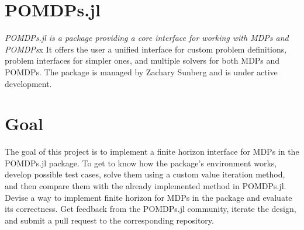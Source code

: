 \section{POMDPs.jl}
\textit{POMDPs.jl is a package providing a core interface for working with MDPs and POMDPs}\cite{JMLR:v18:16-300}x It offers the user a unified interface for custom problem definitions, problem interfaces for simpler ones, and multiple solvers for both MDPs and POMDPs. The package is managed by Zachary Sunberg and is under active development.


\section{Goal}
The goal of this project is to implement a finite horizon interface for MDPs in the POMDPs.jl package. To get to know how the package's environment works, develop possible test cases, solve them using a custom value iteration method, and then compare them with the already implemented method in POMDPs.jl. Devise a way to implement finite horizon for MDPs in the package and evaluate its correctness. Get feedback from the POMDPs.jl community, iterate the design, and submit a pull request to the corresponding repository.


